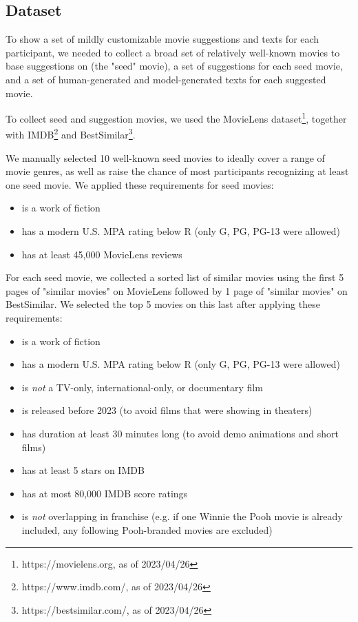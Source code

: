 \subsection{Dataset}

To show a set of mildly customizable movie suggestions and texts for each participant, we needed to collect a broad set of relatively well-known movies to base suggestions on (the "seed" movie), a set of suggestions for each seed movie, and a set of human-generated and model-generated texts for each suggested movie.

To collect seed and suggestion movies, we used the MovieLens dataset\cite{harperMovieLensDatasetsHistory2015}\footnote{https://movielens.org, as of 2023/04/26}, together with IMDB\footnote{https://www.imdb.com/, as of 2023/04/26} and BestSimilar\footnote{https://bestsimilar.com/, as of 2023/04/26}.

We manually selected 10 well-known seed movies to ideally cover a range of movie genres, as well as raise the chance of most participants recognizing at least one seed movie.
We applied these requirements for seed movies:
\begin{itemize}
    \item is a work of fiction
    \item has a modern U.S. MPA rating below R (only G, PG, PG-13 were allowed)
    \item has at least 45,000 MovieLens reviews
\end{itemize}

For each seed movie, we collected a sorted list of similar movies using the first 5 pages of "similar movies" on MovieLens followed by 1 page of "similar movies" on BestSimilar.
We selected the top 5 movies on this last after applying these requirements:
\begin{itemize}
    \item is a work of fiction
    \item has a modern U.S. MPA rating below R (only G, PG, PG-13 were allowed)
    \item is \textit{not} a TV-only, international-only, or documentary film
    \item is released before 2023 (to avoid films that were showing in theaters)
    \item has duration at least 30 minutes long (to avoid demo animations and short films)
    \item has at least 5 stars on IMDB
    \item has at most 80,000 IMDB score ratings
    \item is \textit{not} overlapping in franchise (e.g. if one Winnie the Pooh movie is already included, any following Pooh-branded movies are excluded)
\end{itemize}

